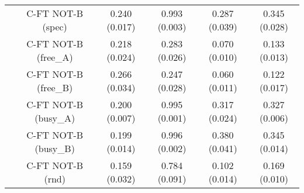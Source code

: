 \begin{table}[h]
{\begin{tabular}{cccccc}
 & C-FT NOT-B (spec)         & 0.240 (0.017) & 0.993 (0.003) & 0.287 (0.039) & 0.345 (0.028) \\ 
 & C-FT NOT-B (free_A)       & 0.218 (0.024) & 0.283 (0.026) & 0.070 (0.010) & 0.133 (0.013) \\ 
 & C-FT NOT-B (free_B)       & 0.266 (0.034) & 0.247 (0.028) & 0.060 (0.011) & 0.122 (0.017) \\ 
 & C-FT NOT-B (busy_A)       & 0.200 (0.007) & 0.995 (0.001) & 0.317 (0.024) & 0.327 (0.006) \\ 
 & C-FT NOT-B (busy_B)       & 0.199 (0.014) & 0.996 (0.002) & 0.380 (0.041) & 0.345 (0.014) \\ 
 & C-FT NOT-B (rnd)          & 0.159 (0.032) & 0.784 (0.091) & 0.102 (0.014) & 0.169 (0.010) \\ \bottomrule
\end{tabular}
}
\end{table}
